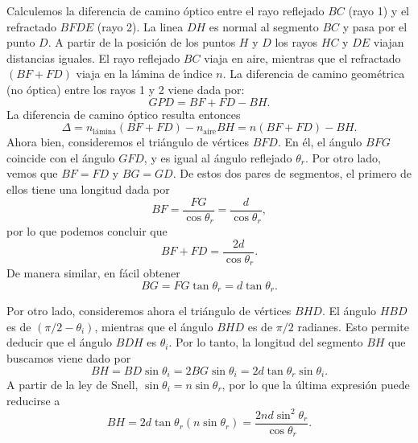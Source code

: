 \documentclass[a4paper]{article}
\begin{document}
Calculemos la diferencia de camino \'optico entre el rayo reflejado $BC$ 
(rayo 1) y el refractado $BFDE$ (rayo 2). La linea $DH$ es normal al segmento 
$BC$ y pasa por el punto $D$. A partir de la posici\'on de los puntos $H$ y $D$
los rayos  $HC$ y $DE$ viajan distancias iguales. El rayo reflejado $BC$ viaja
en aire, mientras que el refractado $(BF + FD)$ viaja en la l\'amina de 
\'\i ndice $n$. La diferencia de camino geom\'etrica (no \'optica) entre los
rayos 1 y 2 viene dada por:
\begin{equation}
GPD = BF + FD - BH.
\end{equation}
La diferencia de camino \'optico resulta entonces
\begin{equation}
    \Delta = n_\text{l\'amina} (BF+FD) - n_\text{aire} BH = n (BF+FD) - BH.
\end{equation}
Ahora bien, consideremos el tri\'angulo de v\'ertices $BFD$. En \'el, el 
\'angulo $BFG$ coincide con el \'angulo $GFD$, y es igual al \'angulo reflejado
$\theta_r$. Por otro lado, vemos que $BF = FD$ y $BG = GD$. De estos dos pares
de segmentos, el primero de ellos tiene una longitud dada por
\begin{equation}
    BF = \frac{FG}{\cos \theta_r} = \frac{d}{\cos \theta_r},
\end{equation}
por lo que podemos concluir que
\begin{equation}
    BF + FD = \frac{2d}{\cos \theta_r}.
\end{equation}
De manera similar, en f\'acil obtener 
\begin{equation}
BG = FG \tan \theta_r = d \tan \theta_r.
\end{equation}

Por otro lado, consideremos ahora el tri\'angulo de v\'ertices $BHD$. El 
\'angulo $HBD$ es de $(\pi/2 - \theta_i)$, mientras que el \'angulo $BHD$ es
de $\pi/2$ radianes. Esto permite deducir que el \'angulo $BDH$ es $\theta_i$.
Por lo tanto, la longitud del segmento $BH$ que buscamos viene dado por
\begin{equation}
BH = BD \sin \theta_i = 2 BG \sin \theta_i = 2 d \tan \theta_r \sin \theta_i.
\end{equation}
A partir de la ley de Snell, $\sin \theta_i = n \sin \theta_r$, por lo que
la \'ultima expresi\'on puede reducirse a
\begin{equation}
    BH = 2d \tan \theta_r \left( n \sin \theta_r \right) = 
    \frac{2 n d \sin^2 \theta_r}{\cos \theta_r}.
\end{equation}
\end{document}
